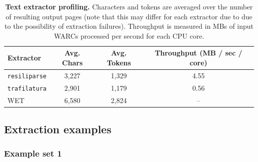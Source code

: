 \documentclass{article}
\newcommand{\trafilatura}{\texttt{trafilatura}\xspace}
\newcommand{\resiliparse}{\texttt{resiliparse}\xspace}
\begin{document}
\begin{table}[h]
\centering
\caption{\textbf{Text extractor profiling.} Characters and tokens are averaged over the number of resulting output pages (note that this may differ for each extractor due to due to the possibility of extraction failures). Throughput is measured in MBs of input WARCs processed per second for each CPU core. }
\label{tab:extractor_profiling}
\begin{tabular}{lccc}
\toprule
     Extractor & Avg. Chars &  Avg. Tokens & Throughput (MB / sec / core) \\
\midrule
    \resiliparse & 3,227 & 1,329 & 4.55  \\
    \trafilatura & 2,901 & 1,179 & 0.56 \\
    WET & 6,580 & 2,824 & -- \\
\midrule
\end{tabular}
\end{table}

\subsection{Extraction examples}\label{app:extraction_examples}

\subsubsection{Example set 1}
\end{document}
